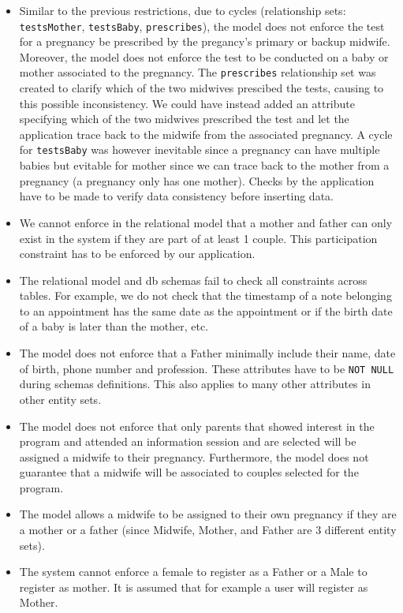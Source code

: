 \documentclass[10pt, letterpaper]{article}
\newcommand{\code}[1]{\texttt{#1}}
\begin{document}
\begin{itemize}
    \item Similar to the previous restrictions, due to cycles (relationship sets: \code{testsMother}, \code{testsBaby}, \code{prescribes}), the model does not enforce the test for a pregnancy be prescribed by the pregancy's primary or backup midwife. Moreover, the model does not enforce the test to be conducted on a baby or mother associated to the pregnancy. The \code{prescribes} relationship set was created to clarify which of the two midwives prescibed the tests, causing to this possible inconsistency. We could have instead added an attribute specifying which of the two midwives prescribed the test and let the application trace back to the midwife from the associated pregnancy. A cycle for \code{testsBaby} was however inevitable since a pregnancy can have multiple babies but evitable for mother since we can trace back to the mother from a pregnancy (a pregnancy only has one mother). Checks by the application have to be made to verify data consistency before inserting data.
    \item We cannot enforce in the relational model that a mother and father can only exist in the system if they are part of at least 1 couple. This participation constraint has to be enforced by our application.
    \item The relational model and db schemas fail to check all constraints across tables. For example, we do not check that the timestamp of a note belonging to an appointment has the same date as the appointment or if the birth date of a baby is later than the mother, etc.
    \item The model does not enforce that a Father minimally include their name, date of
          birth, phone number and profession. These attributes have to be \code{NOT NULL} during schemas definitions. This also applies to many other attributes in other entity sets.
    \item The model does not enforce that only parents that showed interest in the program and attended an information session and are selected will be assigned a midwife to their pregnancy. Furthermore, the model does not guarantee that a midwife will be associated to couples selected for the program.
    \item The model allows a midwife to be assigned to their own pregnancy if they are a mother or a father (since Midwife, Mother, and Father are 3 different entity sets).
    \item The system cannot enforce a female to register as a Father or a Male to register as mother. It is assumed that for example a user will register as Mother.

\end{itemize}
\end{document}

